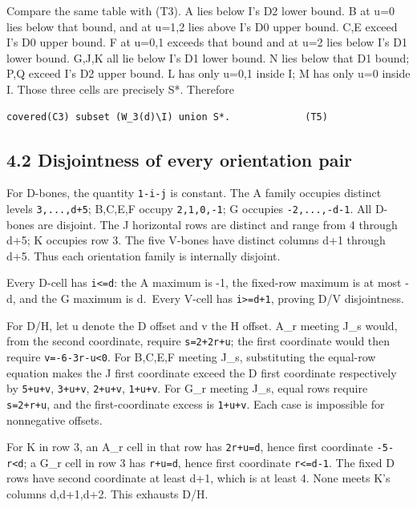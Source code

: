\documentclass[
  10pt,
]{scrreprt}
\begin{document}
Compare the same table with (T3). A lies below I's D2 lower bound. B at
u=0 lies below that bound, and at u=1,2 lies above I's D0 upper bound.
C,E exceed I's D0 upper bound. F at u=0,1 exceeds that bound and at u=2
lies below I's D1 lower bound. G,J,K all lie below I's D1 lower bound. N
lies below that D1 bound; P,Q exceed I's D2 upper bound. L has only
u=0,1 inside I; M has only u=0 inside I. Those three cells are precisely
S*. Therefore

\begin{verbatim}
covered(C3) subset (W_3(d)\I) union S*.             (T5)
\end{verbatim}

\subsection{4.2 Disjointness of every orientation
pair}\label{edition-5-section-6}

For D-bones, the quantity \texttt{1-i-j} is constant. The A family
occupies distinct levels \texttt{3,...,d+5}; B,C,E,F occupy
\texttt{2,1,0,-1}; G occupies \texttt{-2,...,-d-1}. All D-bones are
disjoint. The J horizontal rows are distinct and range from 4 through
d+5; K occupies row 3. The five V-bones have distinct columns d+1
through d+5. Thus each orientation family is internally disjoint.

Every D-cell has \texttt{i\textless{}=d}: the A maximum is -1, the
fixed-row maximum is at most -d, and the G maximum is d.~Every V-cell
has \texttt{i\textgreater{}=d+1}, proving D/V disjointness.

For D/H, let u denote the D offset and v the H offset. A\_r meeting J\_s
would, from the second coordinate, require \texttt{s=2+2r+u}; the first
coordinate would then require \texttt{v=-6-3r-u\textless{}0}. For
B,C,E,F meeting J\_s, substituting the equal-row equation makes the J
first coordinate exceed the D first coordinate respectively by
\texttt{5+u+v}, \texttt{3+u+v}, \texttt{2+u+v}, \texttt{1+u+v}. For G\_r
meeting J\_s, equal rows require \texttt{s=2+r+u}, and the
first-coordinate excess is \texttt{1+u+v}. Each case is impossible for
nonnegative offsets.

For K in row 3, an A\_r cell in that row has \texttt{2r+u=d}, hence
first coordinate \texttt{-5-r\textless{}d}; a G\_r cell in row 3 has
\texttt{r+u=d}, hence first coordinate \texttt{r\textless{}=d-1}. The
fixed D rows have second coordinate at least d+1, which is at least 4.
None meets K's columns d,d+1,d+2. This exhausts D/H.
\end{document}
